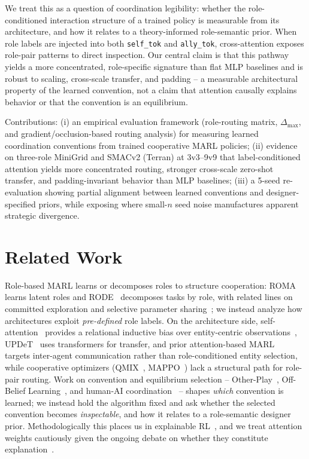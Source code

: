 \documentclass{nextgame2026}
\begin{document}
We treat this as a question of coordination legibility: whether the role-conditioned interaction structure of a trained policy is measurable from its architecture, and how it relates to a theory-informed role-semantic prior. When role labels are injected into both \texttt{self\_tok} and \texttt{ally\_tok}, cross-attention exposes role-pair patterns to direct inspection. Our central claim is that this pathway yields a more concentrated, role-specific signature than flat MLP baselines and is robust to scaling, cross-scale transfer, and padding -- a measurable architectural property of the learned convention, not a claim that attention causally explains behavior or that the convention is an equilibrium.

Contributions: (i) an empirical evaluation framework (role-routing matrix, $\Delta_{\max}$, and gradient/occlusion-based routing analysis) for measuring learned coordination conventions from trained cooperative MARL policies; (ii) evidence on three-role MiniGrid and SMACv2 (Terran) at 3v3--9v9 that label-conditioned attention yields more concentrated routing, stronger cross-scale zero-shot transfer, and padding-invariant behavior than MLP baselines; (iii) a 5-seed re-evaluation showing partial alignment between learned conventions and designer-specified priors, while exposing where small-$n$ seed noise manufactures apparent strategic divergence.
\section{Related Work}
\label{sec:related}

Role-based MARL learns or decomposes roles to structure cooperation: ROMA~\cite{roma2020} learns latent roles and RODE~\cite{rode2021} decomposes tasks by role, with related lines on committed exploration and selective parameter sharing~\cite{maven2019,maac_role}; we instead analyze how architectures exploit \emph{pre-defined} role labels. On the architecture side, self-attention~\cite{attention2017,zambaldi2019} provides a relational inductive bias over entity-centric observations~\cite{entitycentric}, UPDeT~\cite{updet2021} uses transformers for transfer, and prior attention-based MARL~\cite{maddpg,maattn} targets inter-agent communication rather than role-conditioned entity selection, while cooperative optimizers (QMIX~\cite{qmix}, MAPPO~\cite{mappo}) lack a structural path for role-pair routing. Work on convention and equilibrium selection -- Other-Play~\cite{otherplay2020}, Off-Belief Learning~\cite{obl2021}, and human-AI coordination~\cite{overcooked2019} -- shapes \emph{which} convention is learned; we instead hold the algorithm fixed and ask whether the selected convention becomes \emph{inspectable}, and how it relates to a role-semantic designer prior. Methodologically this places us in explainable RL~\cite{xrl_survey2024}, and we treat attention weights cautiously given the ongoing debate on whether they constitute explanation~\cite{jain2019attention,wiegreffe2019attention}.
\end{document}
